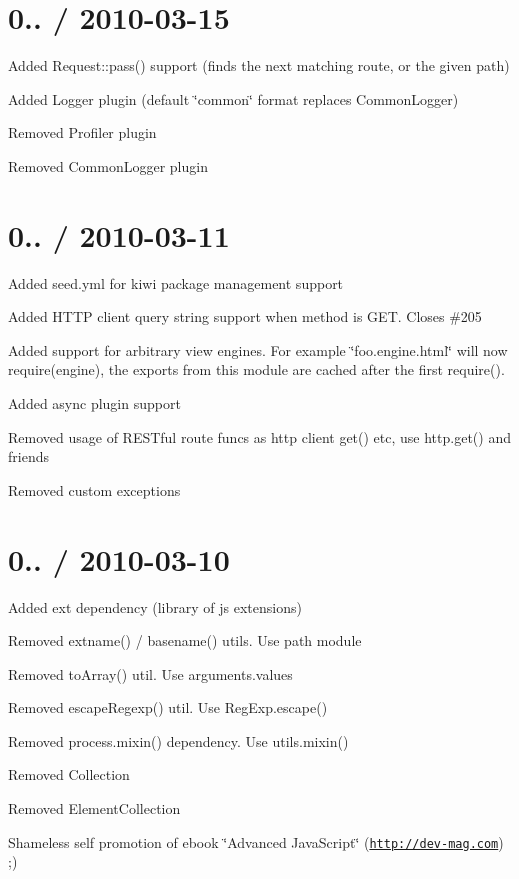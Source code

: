 \section*{0.. / 2010-\/03-\/15 }


\begin{DoxyItemize}
\item Added Request\+::pass() support (finds the next matching route, or the given path)
\item Added Logger plugin (default \char`\"{}common\char`\"{} format replaces Common\+Logger)
\item Removed Profiler plugin
\item Removed Common\+Logger plugin
\end{DoxyItemize}

\section*{0.. / 2010-\/03-\/11 }


\begin{DoxyItemize}
\item Added seed.\+yml for kiwi package management support
\item Added H\+T\+T\+P client query string support when method is G\+E\+T. Closes \#205
\item Added support for arbitrary view engines. For example \char`\"{}foo.\+engine.\+html\char`\"{} will now require(\textquotesingle{}engine\textquotesingle{}), the exports from this module are cached after the first require().
\item Added async plugin support
\item Removed usage of R\+E\+S\+Tful route funcs as http client get() etc, use http.\+get() and friends
\item Removed custom exceptions
\end{DoxyItemize}

\section*{0.. / 2010-\/03-\/10 }


\begin{DoxyItemize}
\item Added ext dependency (library of js extensions)
\item Removed extname() / basename() utils. Use path module
\item Removed to\+Array() util. Use arguments.\+values
\item Removed escape\+Regexp() util. Use Reg\+Exp.\+escape()
\item Removed process.\+mixin() dependency. Use utils.\+mixin()
\item Removed Collection
\item Removed Element\+Collection
\item Shameless self promotion of ebook \char`\"{}\+Advanced Java\+Script\char`\"{} (\href{http://dev-mag.com}{\tt http\+://dev-\/mag.\+com}) ;)
\end{DoxyItemize}

